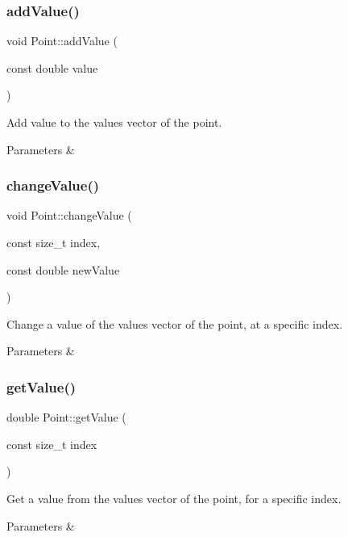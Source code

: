 \subsubsection{\texorpdfstring{add\+Value()}{addValue()}}
{\footnotesize\ttfamily void Point\+::add\+Value (\begin{DoxyParamCaption}\item[{const double}]{value }\end{DoxyParamCaption})}

Add value to the values vector of the point. 
\begin{DoxyParams}{Parameters}
{\em } & \\
\hline
\end{DoxyParams}
\mbox{\label{class_point_a0b2a9878f3eb1b0d091aa7e9b1502258}} 
\subsubsection{\texorpdfstring{change\+Value()}{changeValue()}}
{\footnotesize\ttfamily void Point\+::change\+Value (\begin{DoxyParamCaption}\item[{const size\+\_\+t}]{index,  }\item[{const double}]{new\+Value }\end{DoxyParamCaption})}

Change a value of the values vector of the point, at a specific index. 
\begin{DoxyParams}{Parameters}
{\em } & \\
\hline
\end{DoxyParams}
\mbox{\label{class_point_ae748cbf0b68a726dfdfe9f8b8b6301db}} 
\subsubsection{\texorpdfstring{get\+Value()}{getValue()}}
{\footnotesize\ttfamily double Point\+::get\+Value (\begin{DoxyParamCaption}\item[{const size\+\_\+t}]{index }\end{DoxyParamCaption})}

Get a value from the values vector of the point, for a specific index. 
\begin{DoxyParams}{Parameters}
{\em } & \\
\hline
\end{DoxyParams}
\mbox{\label{class_point_ab5bb69974276cdb13bc74c8585c919a1}} 
